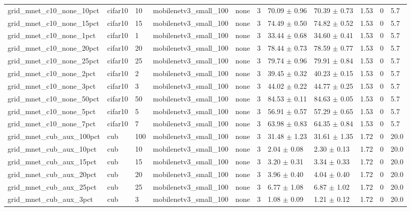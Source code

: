 \begin{tabular}{lllllllllll}
grid_mnet_c10_none_10pct & cifar10 & 10 & mobilenetv3_small_100 & none & 3 & 70.09 $\pm$ 0.96 & 70.39 $\pm$ 0.73 & 1.53 & 0 & 5.7 \\
grid_mnet_c10_none_15pct & cifar10 & 15 & mobilenetv3_small_100 & none & 3 & 74.49 $\pm$ 0.50 & 74.82 $\pm$ 0.52 & 1.53 & 0 & 5.7 \\
grid_mnet_c10_none_1pct & cifar10 & 1 & mobilenetv3_small_100 & none & 3 & 33.44 $\pm$ 0.68 & 34.60 $\pm$ 0.41 & 1.53 & 0 & 5.7 \\
grid_mnet_c10_none_20pct & cifar10 & 20 & mobilenetv3_small_100 & none & 3 & 78.44 $\pm$ 0.73 & 78.59 $\pm$ 0.77 & 1.53 & 0 & 5.7 \\
grid_mnet_c10_none_25pct & cifar10 & 25 & mobilenetv3_small_100 & none & 3 & 79.74 $\pm$ 0.96 & 79.91 $\pm$ 0.84 & 1.53 & 0 & 5.7 \\
grid_mnet_c10_none_2pct & cifar10 & 2 & mobilenetv3_small_100 & none & 3 & 39.45 $\pm$ 0.32 & 40.23 $\pm$ 0.15 & 1.53 & 0 & 5.7 \\
grid_mnet_c10_none_3pct & cifar10 & 3 & mobilenetv3_small_100 & none & 3 & 44.02 $\pm$ 0.22 & 44.77 $\pm$ 0.25 & 1.53 & 0 & 5.7 \\
grid_mnet_c10_none_50pct & cifar10 & 50 & mobilenetv3_small_100 & none & 3 & 84.53 $\pm$ 0.11 & 84.63 $\pm$ 0.05 & 1.53 & 0 & 5.7 \\
grid_mnet_c10_none_5pct & cifar10 & 5 & mobilenetv3_small_100 & none & 3 & 56.91 $\pm$ 0.57 & 57.29 $\pm$ 0.65 & 1.53 & 0 & 5.7 \\
grid_mnet_c10_none_7pct & cifar10 & 7 & mobilenetv3_small_100 & none & 3 & 63.98 $\pm$ 0.83 & 64.35 $\pm$ 0.84 & 1.53 & 0 & 5.7 \\
grid_mnet_cub_aux_100pct & cub & 100 & mobilenetv3_small_100 & none & 3 & 31.48 $\pm$ 1.23 & 31.61 $\pm$ 1.35 & 1.72 & 0 & 20.0 \\
grid_mnet_cub_aux_10pct & cub & 10 & mobilenetv3_small_100 & none & 3 & 2.04 $\pm$ 0.08 & 2.30 $\pm$ 0.13 & 1.72 & 0 & 20.0 \\
grid_mnet_cub_aux_15pct & cub & 15 & mobilenetv3_small_100 & none & 3 & 3.20 $\pm$ 0.31 & 3.34 $\pm$ 0.33 & 1.72 & 0 & 20.0 \\
grid_mnet_cub_aux_20pct & cub & 20 & mobilenetv3_small_100 & none & 3 & 3.96 $\pm$ 0.40 & 4.04 $\pm$ 0.40 & 1.72 & 0 & 20.0 \\
grid_mnet_cub_aux_25pct & cub & 25 & mobilenetv3_small_100 & none & 3 & 6.77 $\pm$ 1.08 & 6.87 $\pm$ 1.02 & 1.72 & 0 & 20.0 \\
grid_mnet_cub_aux_3pct & cub & 3 & mobilenetv3_small_100 & none & 3 & 1.08 $\pm$ 0.09 & 1.21 $\pm$ 0.12 & 1.72 & 0 & 20.0 \\

\end{tabular}
